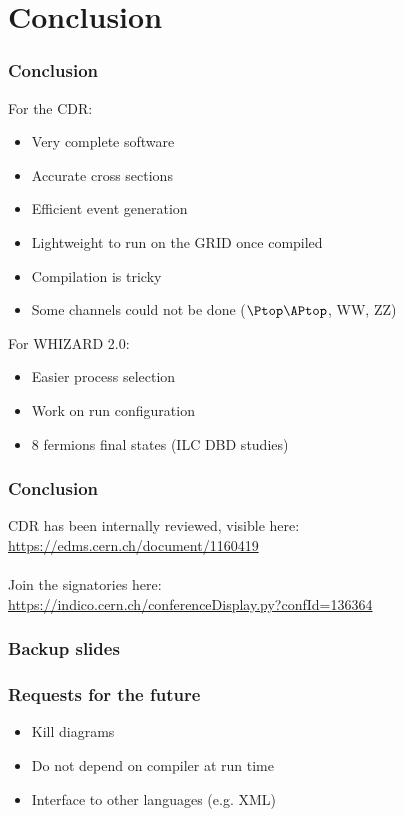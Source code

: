 \documentclass{beamer}
\newcommand{\whizard}{WHIZARD\xspace}
\begin{document}
\section{Conclusion}
\begin{frame}
\frametitle{Conclusion}
For the CDR:
\begin{itemize}
  \item Very complete software
  \item Accurate cross sections
  \item Efficient event generation
  \item Lightweight to run on the GRID once compiled
  \item Compilation is tricky
  \item Some channels could not be done ($\Ptop\APtop$, WW, ZZ)
\end{itemize}
For \whizard 2.0:
\begin{itemize}
  \item Easier process selection
  \item Work on run configuration
  \item 8 fermions final states (ILC DBD studies)
\end{itemize}
\end{frame}
\begin{frame}
\frametitle{Conclusion} 
CDR has been internally reviewed, visible here:\\
 \url{https://edms.cern.ch/document/1160419}\\
~\\
Join the signatories here:\\
\url{https://indico.cern.ch/conferenceDisplay.py?confId=136364}
\end{frame}

\appendix
\begin{frame} 
\frametitle{Backup slides}
\end{frame}
\begin{frame}
\frametitle{Requests for the future}
\begin{itemize}
  \item Kill diagrams
  \item Do not depend on compiler at run time
  \item Interface to other languages (e.g. XML)
\end{itemize}
\end{frame}
\end{document}

